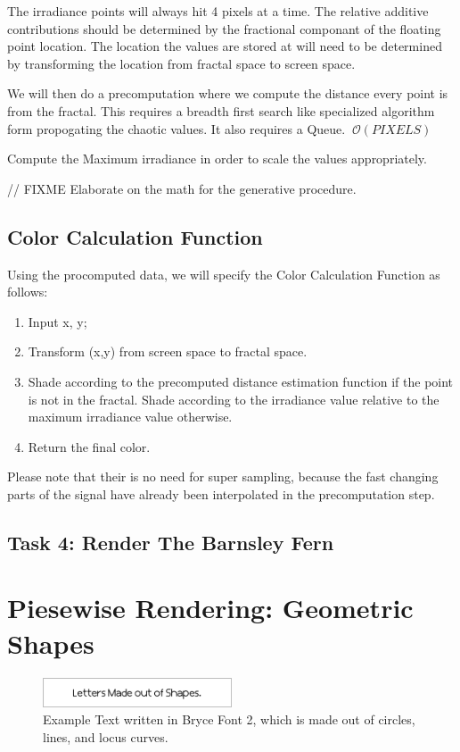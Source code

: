 \documentclass[12pt, letterpaper]{article}
\newcommand{\bigO}{\mathcal{O}}
\begin{document}
The irradiance points will always hit 4 pixels at a time. The relative additive contributions should be determined by the fractional componant of the floating point location. The location the values are stored at will need to be determined by transforming the location from fractal space to screen space.

We will then do a precomputation where we compute the distance every point is from the fractal. This requires a breadth first search like specialized algorithm form propogating the chaotic values. It also requires a Queue. $~\bigO(PIXELS)$

Compute the Maximum irradiance in order to scale the values appropriately.

// FIXME Elaborate on the math for the generative procedure.

\subsection{Color Calculation Function}

Using the procomputed data, we will specify the Color Calculation Function as follows:

\begin{enumerate}
\item Input x, y;
\item Transform (x,y) from screen space to fractal space.
\item Shade according to the precomputed distance estimation function if the point is not in the fractal. Shade according to the irradiance value relative to the maximum irradiance value otherwise.
\item Return the final color.
\end{enumerate}

Please note that their is no need for super sampling, because the fast changing parts of the signal have already been interpolated in the precomputation step.

\subsection{Task 4: Render The Barnsley Fern}


\section{Piesewise Rendering: Geometric Shapes}

\begin{figure}[h]
\centering
\includegraphics[width=0.5\textwidth]{RenderedText.png}
\caption{Example Text written in Bryce Font 2, which is made out of circles, lines, and locus curves.}
\label{fig:Sub-Line}
\end{figure}
\end{document}
